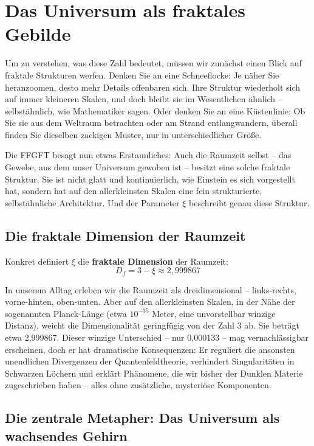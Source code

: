 \section{Das Universum als fraktales Gebilde}

Um zu verstehen, was diese Zahl bedeutet, müssen wir zunächst einen Blick auf fraktale Strukturen werfen. Denken Sie an eine Schneeflocke: Je näher Sie heranzoomen, desto mehr Details offenbaren sich. Ihre Struktur wiederholt sich auf immer kleineren Skalen, und doch bleibt sie im Wesentlichen ähnlich – selbstähnlich, wie Mathematiker sagen. Oder denken Sie an eine Küstenlinie: Ob Sie sie aus dem Weltraum betrachten oder am Strand entlangwandern, überall finden Sie dieselben zackigen Muster, nur in unterschiedlicher Größe.

Die FFGFT besagt nun etwas Erstaunliches: Auch die Raumzeit selbst – das Gewebe, aus dem unser Universum gewoben ist – besitzt eine solche fraktale Struktur. Sie ist nicht glatt und kontinuierlich, wie Einstein es sich vorgestellt hat, sondern hat auf den allerkleinsten Skalen eine fein strukturierte, selbstähnliche Architektur. Und der Parameter $\xi$ beschreibt genau diese Struktur.

\subsection{Die fraktale Dimension der Raumzeit}

Konkret definiert $\xi$ die \textbf{fraktale Dimension} der Raumzeit:
\begin{equation}
D_f = 3 - \xi \approx 2,999867
\end{equation}

In unserem Alltag erleben wir die Raumzeit als dreidimensional – links-rechts, vorne-hinten, oben-unten. Aber auf den allerkleinsten Skalen, in der Nähe der sogenannten Planck-Länge (etwa $10^{-35}$ Meter, eine unvorstellbar winzige Distanz), weicht die Dimensionalität geringfügig von der Zahl 3 ab. Sie beträgt etwa 2,999867. Dieser winzige Unterschied – nur 0,000133 – mag vernachlässigbar erscheinen, doch er hat dramatische Konsequenzen: Er reguliert die ansonsten unendlichen Divergenzen der Quantenfeldtheorie, verhindert Singularitäten in Schwarzen Löchern und erklärt Phänomene, die wir bisher der Dunklen Materie zugeschrieben haben – alles ohne zusätzliche, mysteriöse Komponenten.

\subsection{Die zentrale Metapher: Das Universum als wachsendes Gehirn}

